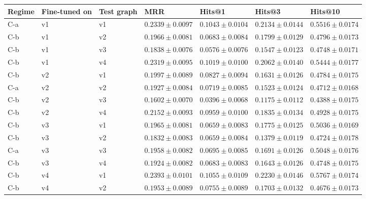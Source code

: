 \begin{table}[htbp]
\centering
\small
\renewcommand{\arraystretch}{1.15}
\setlength{\tabcolsep}{5pt}
\begin{adjustbox}{max width=\linewidth}
\begin{tabular}{|l|l|l|l|l|l|l|}
\hline
\textbf{Regime} & \textbf{Fine-tuned on} & \textbf{Test graph} & \textbf{MRR} & \textbf{Hits@1} & \textbf{Hits@3} & \textbf{Hits@10} \\
\hline
C-a & v1 & v1 & $0.2339 \pm 0.0097$ & $0.1043 \pm 0.0104$ & $0.2134 \pm 0.0144$ & $0.5516 \pm 0.0174$ \\
\hline
C-b & v1 & v2 & $0.1966 \pm 0.0081$ & $0.0683 \pm 0.0084$ & $0.1799 \pm 0.0129$ & $0.4796 \pm 0.0173$ \\
\hline
C-b & v1 & v3 & $0.1838 \pm 0.0076$ & $0.0576 \pm 0.0076$ & $0.1547 \pm 0.0123$ & $0.4748 \pm 0.0171$ \\
\hline
C-b & v1 & v4 & $0.2319 \pm 0.0095$ & $0.1019 \pm 0.0100$ & $0.2062 \pm 0.0140$ & $0.5444 \pm 0.0177$ \\
\hline
C-b & v2 & v1 & $0.1997 \pm 0.0089$ & $0.0827 \pm 0.0094$ & $0.1631 \pm 0.0126$ & $0.4784 \pm 0.0175$ \\
\hline
C-a & v2 & v2 & $0.1927 \pm 0.0084$ & $0.0719 \pm 0.0085$ & $0.1523 \pm 0.0124$ & $0.4712 \pm 0.0168$ \\
\hline
C-b & v2 & v3 & $0.1602 \pm 0.0070$ & $0.0396 \pm 0.0068$ & $0.1175 \pm 0.0112$ & $0.4388 \pm 0.0175$ \\
\hline
C-b & v2 & v4 & $0.2152 \pm 0.0093$ & $0.0959 \pm 0.0100$ & $0.1835 \pm 0.0134$ & $0.4928 \pm 0.0175$ \\
\hline
C-b & v3 & v1 & $0.1965 \pm 0.0081$ & $0.0659 \pm 0.0083$ & $0.1775 \pm 0.0125$ & $0.5036 \pm 0.0169$ \\
\hline
C-b & v3 & v2 & $0.1832 \pm 0.0083$ & $0.0659 \pm 0.0084$ & $0.1379 \pm 0.0119$ & $0.4724 \pm 0.0178$ \\
\hline
C-a & v3 & v3 & $0.1958 \pm 0.0082$ & $0.0695 \pm 0.0085$ & $0.1691 \pm 0.0126$ & $0.5048 \pm 0.0176$ \\
\hline
C-b & v3 & v4 & $0.1924 \pm 0.0082$ & $0.0683 \pm 0.0083$ & $0.1643 \pm 0.0126$ & $0.4748 \pm 0.0175$ \\
\hline
C-b & v4 & v1 & $0.2393 \pm 0.0101$ & $0.1055 \pm 0.0109$ & $0.2230 \pm 0.0146$ & $0.5767 \pm 0.0174$ \\
\hline
C-b & v4 & v2 & $0.1953 \pm 0.0089$ & $0.0755 \pm 0.0089$ & $0.1703 \pm 0.0132$ & $0.4676 \pm 0.0173$ \\

\end{tabular}
\end{adjustbox}
\end{table}
